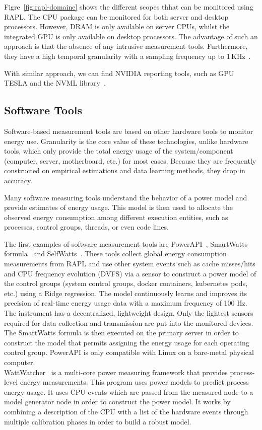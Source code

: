Figre~\ref{fig:rapl-domaine} shows the different scopes  thhat can be monitored using RAPL.
The CPU package can be monitored for both server and desktop processors. However, DRAM is only available on server CPUs, whilst the integrated GPU is only available on desktop processors.
The advantage of such an approach is that the absence of any intrusive measurement tools.
Furthermore, they have a high temporal granularity with a sampling frequency up to 1\,KHz~\cite{ilsche_power_2015}.

With similar approach, we can find NVIDIA reporting tools, such as GPU TESLA \cite{burtscher2014measuring} and the NVML library~\cite{fahad2019comparative}.

\subsection{Software Tools}
Software-based measurement tools are based on other hardware tools to monitor energy use. Granularity is the core value of these technologies, unlike hardware tools, which only provide the total energy usage of the system/component (computer, server, motherboard, etc.) for most cases.
Because they are frequently constructed on empirical estimations and data learning methods, they drop in accuracy.

Many software measuring tools understand the behavior of a power model and provide estimates of energy usage.
This model is then used to allocate the observed energy consumption among different execution entities, such as processes, control groups, threads, or even code lines.

The first examples of software measurement tools are PowerAPI~\cite{colmant2018next}, SmartWatts formula~\cite{fieni2020smartwatts} and SelfWatts~\cite{fieni2021selfwatts}.
These tools collect global energy consumption measurements from RAPL and use other system events such as cache misses/hits and CPU frequency evolution (DVFS) via a sensor to construct a power model of the control groups (system control groups, docker containers, kubernetes pods, etc.) using a Ridge regression.
The model continuously learns and improves its precision of real-time energy usage data with a maximum frequency of 100 Hz.
The instrument has a decentralized, lightweight design.
Only the lightest sensors required for data collection and transmission are put into the monitored devices.
The SmartWatts formula is then executed on the primary server in order to construct the model that permits assigning the energy usage for each operating control group.
PowerAPI is only compatible with Linux on a bare-metal physical computer.
\\
WattWatcher~\cite{lebeane2015watt} is a multi-core power measuring framework that provides process-level energy measurements.
This program uses power models to predict process energy usage. It uses CPU events which are passed from the measured node to a model generator node in order to construct the power model. It works by combining a description of the CPU with a list of the hardware events through multiple calibration phases in order to build a robust model.

